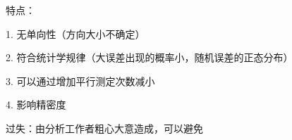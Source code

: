 \begin{eg}
\begin{defi}
    特点：

    1. 无单向性（方向大小不确定）

    2. 符合统计学规律（大误差出现的概率小，随机误差的正态分布）

    3. 可以通过增加平行测定次数减小

    4. 影响精密度
\end{defi}
\begin{defi}
    过失：由分析工作者粗心大意造成，可以避免
\end{defi}


















































\end{eg}


















